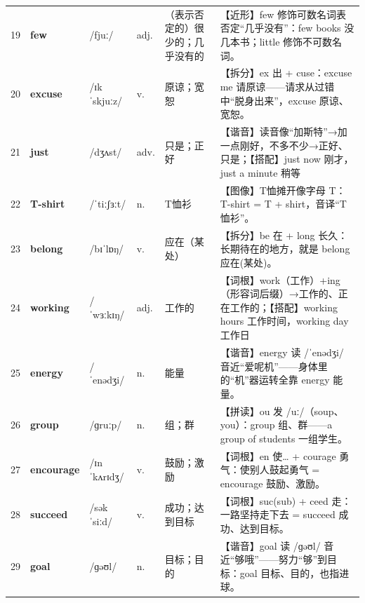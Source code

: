 \documentclass[UTF8,a4paper,11pt,oneside]{ctexbook}
\newcommand{\cellword}[1]{{\bfseries\textcolor{wordcol}{#1}}}
\newcommand{\cellipa}[1]{{\footnotesize\textcolor{ipacol}{#1}}}
\newcommand{\cellpos}[1]{\textcolor{poscol}{#1}}
\newcommand{\cellno}[1]{\textcolor{volcolor!75!black}{#1}}
\begin{document}
{\begin{longtable}{@{}C{0.045\textwidth}L{0.155\textwidth}L{0.175\textwidth}C{0.070\textwidth}L{0.180\textwidth}L{0.282\textwidth}@{}}
 \cellno{19} & \cellword{few} & \cellipa{/fjuː/} & \cellpos{adj.} & （表示否定的）很少的；几乎没有的 & \textcolor{tagNear}{【近形】}few 修饰可数名词表否定“几乎没有”：few books 没几本书；little 修饰不可数名词。 \\
\cellno{20} & \cellword{excuse} & \cellipa{/ɪkˈskjuːz/} & \cellpos{v.} & 原谅；宽恕 & \textcolor{tagSplit}{【拆分】}ex 出 + cuse：excuse me 请原谅——请求从过错中“脱身出来”，excuse 原谅、宽恕。 \\
 \cellno{21} & \cellword{just} & \cellipa{/dʒʌst/} & \cellpos{adv.} & 只是；正好 & \textcolor{tagSound}{【谐音】}读音像“加斯特”→\allowbreak{}加一点刚好，不多不少→\allowbreak{}正好、只是；\textcolor{tagColloc}{【搭配】}just now 刚才，just a minute 稍等 \\
\cellno{22} & \cellword{T-shirt} & \cellipa{/ˈtiːʃɜːt/} & \cellpos{n.} & T恤衫 & \textcolor{tagImage}{【图像】}T恤摊开像字母 T：T-shirt = T + shirt，音译“T恤衫”。 \\
 \cellno{23} & \cellword{belong} & \cellipa{/bɪˈlɒŋ/} & \cellpos{v.} & 应在（某处） & \textcolor{tagSplit}{【拆分】}be 在 + long 长久：长期待在的地方，就是 belong 应在(某处)。 \\
\cellno{24} & \cellword{working} & \cellipa{/ˈwɜːkɪŋ/} & \cellpos{adj.} & 工作的 & \textcolor{tagRoot}{【词根】}work（工作）+ing（形容词后缀）→\allowbreak{}工作的、正在工作的；\textcolor{tagColloc}{【搭配】}working hours 工作时间，working day 工作日 \\
 \cellno{25} & \cellword{energy} & \cellipa{/ˈenədʒi/} & \cellpos{n.} & 能量 & \textcolor{tagSound}{【谐音】}energy 读 /ˈenədʒi/ 音近“爱呢机”——身体里的“机”器运转全靠 energy 能量。 \\
\cellno{26} & \cellword{group} & \cellipa{/ɡruːp/} & \cellpos{n.} & 组；群 & \textcolor{tagSpell}{【拼读】}ou 发 /uː/（soup、you）：group 组、群——a group of students 一组学生。 \\
 \cellno{27} & \cellword{encourage} & \cellipa{/ɪnˈkʌrɪdʒ/} & \cellpos{v.} & 鼓励；激励 & \textcolor{tagRoot}{【词根】}en 使… + courage 勇气：使别人鼓起勇气 = encourage 鼓励、激励。 \\
\cellno{28} & \cellword{succeed} & \cellipa{/səkˈsiːd/} & \cellpos{v.} & 成功；达到目标 & \textcolor{tagRoot}{【词根】}suc(sub) + ceed 走：一路坚持走下去 = succeed 成功、达到目标。 \\
 \cellno{29} & \cellword{goal} & \cellipa{/ɡəʊl/} & \cellpos{n.} & 目标；目的 & \textcolor{tagSound}{【谐音】}goal 读 /ɡəʊl/ 音近“够哦”——努力“够”到目标：goal 目标、目的，也指进球。 \\

\end{longtable}}
\end{document}
